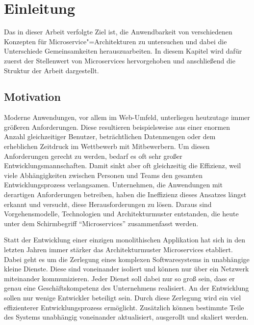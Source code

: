 \chapter{Einleitung}

Das in dieser Arbeit verfolgte Ziel ist, die Anwendbarkeit von verschiedenen Konzepten für Microservice"=Architekturen zu untersuchen und dabei die Unterschiede \bzw Gemeinsamkeiten herauszuarbeiten. In diesem Kapitel wird dafür zuerst der Stellenwert von Microservices hervorgehoben und anschließend die Struktur der Arbeit dargestellt.

\section{Motivation}

Moderne Anwendungen, vor allem im Web-Umfeld, unterliegen heutzutage immer größeren Anforderungen. Diese resultieren beispielsweise aus einer enormen Anzahl gleichzeitiger Benutzer, beträchtlichen Datenmengen oder dem erheblichen Zeitdruck im Wettbewerb mit Mitbewerbern. Um diesen Anforderungen gerecht zu werden, bedarf es oft sehr großer Entwicklungsmannschaften. Damit sinkt aber oft gleichzeitig die Effizienz, weil viele Abhängigkeiten zwischen Personen und Teams den gesamten Entwicklungsprozess verlangsamen. Unternehmen, die Anwendungen mit derartigen Anforderungen betreiben, haben die Ineffizienz dieses Ansatzes längst erkannt und versucht, diese Herausforderungen zu lösen. Daraus sind Vorgehensmodelle, Technologien und Architekturmuster entstanden, die heute unter dem Schirmbegriff "`Microservices"' zusammenfasst werden.

Statt der Entwicklung einer einzigen monolithischen Applikation hat sich in den letzten Jahren immer stärker das Architekturmuster Microservices etabliert. Dabei geht es um die Zerlegung eines komplexen Softwaresystems in unabhängige kleine Dienste. Diese sind voneinander isoliert und können nur über ein Netzwerk miteinander kommunizieren. Jeder Dienst soll dabei nur so groß sein, dass er genau eine Geschäftskompetenz des Unternehmens realisiert. An der Entwicklung sollen nur wenige Entwickler beteiligt sein. Durch diese Zerlegung wird ein viel effizienterer Entwicklungsprozess ermöglicht. Zusätzlich können bestimmte Teile des Systems unabhängig voneinander aktualisiert, ausgerollt und skaliert werden.

